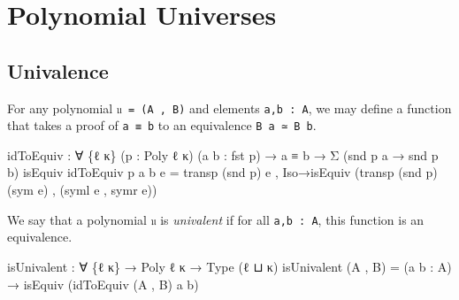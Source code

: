 \documentclass[
  11pt,
  oneside,
  article]{memoir}
\newenvironment{Shaded}{}{}
\newcommand{\NormalTok}[1]{#1}
\newcommand{\OtherTok}[1]{\textcolor[rgb]{0.00,0.44,0.13}{#1}}
\theoremstyle{definition}
\theoremstyle{plain}
\newcommand{\0}{\textsf{0}}
\newcommand{\1}{\tn{\textsf{1}}}
\begin{document}
\chapter{Polynomial Universes}\label{polynomial-universes}

\section{Univalence}\label{univalence}

For any polynomial \texttt{𝔲\ =\ (A\ ,\ B)} and elements
\texttt{a,b\ :\ A}, we may define a function that takes a proof of
\texttt{a\ ≡\ b} to an equivalence \texttt{B\ a\ ≃\ B\ b}.

\begin{Shaded}
\begin{Highlighting}[]
\NormalTok{idToEquiv }\OtherTok{:} \OtherTok{∀} \OtherTok{\{}\NormalTok{ℓ κ}\OtherTok{\}} \OtherTok{(}\NormalTok{p }\OtherTok{:}\NormalTok{ Poly ℓ κ}\OtherTok{)} \OtherTok{(}\NormalTok{a b }\OtherTok{:}\NormalTok{ fst p}\OtherTok{)}
            \OtherTok{→}\NormalTok{ a ≡ b }\OtherTok{→}\NormalTok{ Σ }\OtherTok{(}\NormalTok{snd p a }\OtherTok{→}\NormalTok{ snd p b}\OtherTok{)}\NormalTok{ isEquiv}
\NormalTok{idToEquiv p a b e }\OtherTok{=} 
\NormalTok{      transp }\OtherTok{(}\NormalTok{snd p}\OtherTok{)}\NormalTok{ e}
\NormalTok{    , Iso→isEquiv }\OtherTok{(}\NormalTok{transp }\OtherTok{(}\NormalTok{snd p}\OtherTok{)} \OtherTok{(}\NormalTok{sym e}\OtherTok{)}\NormalTok{ , }\OtherTok{(}\NormalTok{syml e , symr e}\OtherTok{))}
\end{Highlighting}
\end{Shaded}

We say that a polynomial \texttt{𝔲} is \emph{univalent} if for all
\texttt{a,b\ :\ A}, this function is an equivalence.

\begin{Shaded}
\begin{Highlighting}[]
\NormalTok{isUnivalent }\OtherTok{:} \OtherTok{∀} \OtherTok{\{}\NormalTok{ℓ κ}\OtherTok{\}} \OtherTok{→}\NormalTok{ Poly ℓ κ }\OtherTok{→}\NormalTok{ Type }\OtherTok{(}\NormalTok{ℓ ⊔ κ}\OtherTok{)}
\NormalTok{isUnivalent }\OtherTok{(}\NormalTok{A , B}\OtherTok{)} \OtherTok{=} 
    \OtherTok{(}\NormalTok{a b }\OtherTok{:}\NormalTok{ A}\OtherTok{)} \OtherTok{→}\NormalTok{ isEquiv }\OtherTok{(}\NormalTok{idToEquiv }\OtherTok{(}\NormalTok{A , B}\OtherTok{)}\NormalTok{ a b}\OtherTok{)}
\end{Highlighting}
\end{Shaded}
\end{document}
